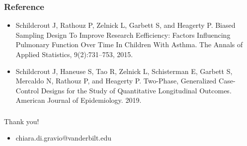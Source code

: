 \documentclass[pdf]{beamer}
\begin{document}
\begin{frame}
\frametitle{Reference}
\begin{itemize}
	\setlength\itemsep{0.8em}
	\item Schildcrout J, Rathouz P, Zelnick L, Garbett S, and Heagerty P. Biased Sampling Design To Improve Research Eefficiency: Factors Influencing Pulmonary Function Over Time In Children With Asthma. The Annals of Applied Statistics, 9(2):731–753, 2015.
	\item Schildcrout J, Haneuse S, Tao R, Zelnick L, Schisterman E, Garbett S, Mercaldo N, Rathouz P, and Heagerty P. Two-Phase, Generalized Case-Control Designs for the Study of Quantitative Longitudinal Outcomes. American Journal of Epidemiology. 2019. 
\end{itemize}
\end{frame}


\begin{frame}
\frametitle{}

\begin{center}
\LARGE{Thank you!}
\end{center}

\vspace{0.5cm}

\begin{itemize}
\item \normalsize{chiara.di.gravio@vanderbilt.edu}
\end{itemize}

\end{frame}


\end{document}
